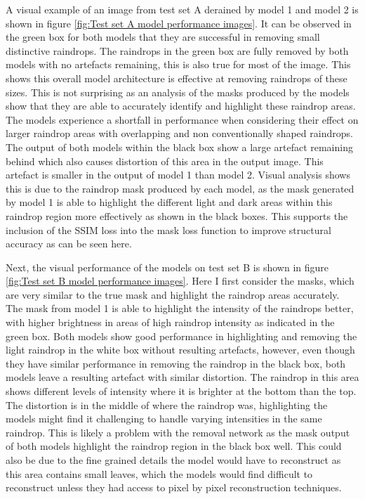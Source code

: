 \documentclass[11pt]{ociamthesis}  %
\begin{document}
A visual example of an image from test set A derained by model 1 and model 2 is shown in figure \ref{fig:Test set A model performance images}. It can be observed in the green box for both models that they are successful in removing small distinctive raindrops. The raindrops in the green box are fully removed by both models with no artefacts remaining, this is also true for most of the image. This shows this overall model architecture is effective at removing raindrops of these sizes. This is not surprising as an analysis of the masks produced by the models show that they are able to accurately identify and highlight these raindrop areas. The models experience a shortfall in performance when considering their effect on larger raindrop areas with overlapping and non conventionally shaped raindrops. The output of both models within the black box show a large artefact remaining behind which also causes distortion of this area in the output image. This artefact is smaller in the output of model 1 than model 2. Visual analysis shows this is due to the raindrop mask produced by each model, as the mask generated by model 1 is able to highlight the different light and dark areas within this raindrop region more effectively as shown in the black boxes. This supports the inclusion of the SSIM loss into the mask loss function to improve structural accuracy as can be seen here.

Next, the visual performance of the models on test set B is shown in figure \ref{fig:Test set B model performance images}. Here I first consider the masks, which are very similar to the true mask and highlight the raindrop areas accurately. The mask from model 1 is able to highlight the intensity of the raindrops better, with higher brightness in areas of high raindrop intensity as indicated in the green box. Both models show good performance in highlighting and removing the light raindrop in the white box without resulting artefacts, however, even though they have similar performance in removing the raindrop in the black box, both models leave a resulting artefact with similar distortion. The raindrop in this area shows different levels of intensity where it is brighter at the bottom than the top. The distortion is in the middle of where the raindrop was, highlighting the models might find it challenging to handle varying intensities in the same raindrop. This is likely a problem with the removal network as the mask output of both models highlight the raindrop region in the black box well. This could also be due to the fine grained details the model would have to reconstruct as this area contains small leaves, which the models would find difficult to reconstruct unless they had access to pixel by pixel reconstruction techniques. 
\end{document}
